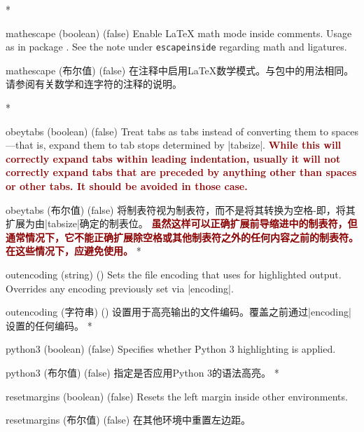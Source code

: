 \begin{optionlist}
\begin{paracol}{2}
\switchcolumn[0]*%
  \item[mathescape (boolean) (false)]
    Enable \LaTeX{} math mode inside comments.
    Usage as in package .
    See the note under \texttt{escapeinside} regarding math and ligatures.
    \switchcolumn
    \item[mathescape (布尔值) (false)]
    在注释中启用\LaTeX{}数学模式。与包中的用法相同。请参阅有关数学和连字符的注释的说明。

\switchcolumn[0]*%
  \item[obeytabs (boolean) (false)]
    Treat tabs as tabs instead of converting them to spaces---that is, expand them to tab stops determined by |tabsize|.  \textcolor{DarkRed}{\textbf{While this will correctly expand tabs within leading indentation, usually it will not correctly expand tabs that are preceded by anything other than spaces or other tabs.  It should be avoided in those case.}}
    \switchcolumn
    \item[obeytabs (布尔值) (false)]
    将制表符视为制表符，而不是将其转换为空格-即，将其扩展为由|tabsize|确定的制表位。 \textcolor{DarkRed}{\textbf{虽然这样可以正确扩展前导缩进中的制表符，但通常情况下，它不能正确扩展除空格或其他制表符之外的任何内容之前的制表符。在这些情况下，应避免使用。}}
    \switchcolumn[0]*%
  \item[outencoding (string) (\meta{system-specific})]
    Sets the file encoding that  uses for highlighted output.  Overrides any encoding previously set via |encoding|.
    \switchcolumn
    \item[outencoding (字符串) (\meta{系统特定})]
    设置用于高亮输出的文件编码。覆盖之前通过|encoding|设置的任何编码。
\switchcolumn[0]*%
  \item[python3 (boolean) (false)] 
    Specifies whether Python 3 highlighting is applied.
    \switchcolumn
    \item[python3 (布尔值) (false)] 
    指定是否应用Python 3的语法高亮。
\switchcolumn[0]*%
  \item[resetmargins (boolean) (false)]
    Resets the left margin inside other environments.
    \switchcolumn
    \item[resetmargins (布尔值) (false)]
    在其他环境中重置左边距。


\end{paracol}
\end{optionlist}
